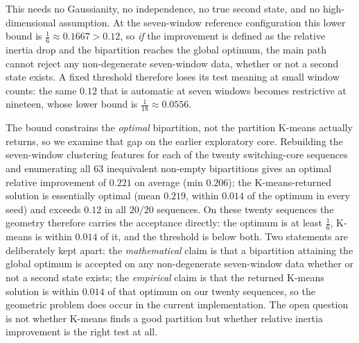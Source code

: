 \documentclass[11pt]{article}
\begin{document}
This needs no Gaussianity, no independence, no true second state, and no
high-dimensional assumption. At the seven-window reference configuration this lower bound is
$\tfrac16\approx0.1667>0.12$, so \emph{if} the improvement is defined as the
relative inertia drop and the bipartition reaches the global optimum, the main
path cannot reject any non-degenerate seven-window data, whether or not a second
state exists. A fixed threshold therefore loses its test meaning at small window
counts: the same $0.12$ that is automatic at seven windows becomes restrictive at
nineteen, whose lower bound is $\tfrac1{18}\approx0.0556$.

The bound constrains the \emph{optimal} bipartition, not the partition K-means
actually returns, so we examine that gap on the earlier exploratory core. Rebuilding
the seven-window clustering features for each of the twenty switching-core
sequences and enumerating all $63$ inequivalent non-empty bipartitions gives an
optimal relative improvement of $0.221$ on average (min $0.206$); the
K-means-returned solution is essentially optimal (mean $0.219$, within $0.014$
of the optimum in every seed) and exceeds $0.12$ in all $20/20$ sequences. On
these twenty sequences the geometry therefore carries the acceptance directly:
the optimum is at least $\tfrac16$, K-means is within $0.014$ of it, and the threshold is
below both. Two statements are deliberately kept apart: the \emph{mathematical}
claim is that a bipartition attaining the global optimum is accepted on any
non-degenerate seven-window data whether or not a second state exists; the
\emph{empirical} claim is that the returned K-means solution is within
$0.014$ of that optimum on our twenty sequences, so the geometric problem does occur in the
current implementation. The open question is not whether K-means finds a good
partition but whether relative inertia improvement is the right test at all.
\end{document}
